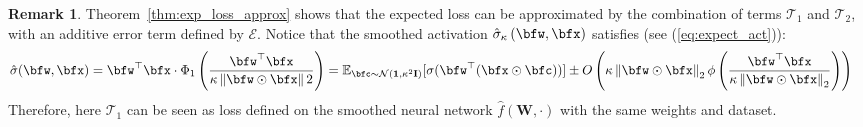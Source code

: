 \documentclass[10pt]{article} %
\theoremstyle{definition}
\newtheorem{remark}[theorem]{Remark}
\theoremstyle{plain}
\newcommand{\paren}[1]{\left(#1\right)}
\newcommand{\norm}[1]{\left\|#1\right\|}
\newcommand{\indy}[1]{\mathbb{I}\left\{#1\right\}}
\newcommand{\act}[2]{\hat{\sigma}_{\kappa}\paren{#1,#2}}
\providecommand{\E}{\mathbb{E}}
\begin{document}
\begin{remark}
Theorem~\ref{thm:exp_loss_approx} shows that the expected loss can be approximated by the combination of terms $\mathcal{T}_1$ and $\mathcal{T}_2$, with an additive error term defined by $\mathcal{E}$. 
Notice that 
the smoothed activation $\act{\bfw}{\bfx}$ satisfies (see (\ref{eq:expect_act})):
\begin{align*}
    \hat{\sigma}(\bfw, \bfx) &= \bfw^\top\bfx \cdot \Phi_1\left(\frac{\bfw^\top\bfx}{\kappa\norm{\bfw \odot \bfx}2}\right)
    = \E_{\bfc \sim \mathcal{N}(\mathbf{1}, \kappa^2\mathbf{I})}[\sigma(\bfw^\top(\bfx \odot \bfc))]
    \pm O\paren{\kappa\norm{\bfw\odot\bfx}_2\phi\paren{\frac{\bfw^\top\bfx}{\kappa\norm{\bfw\odot\bfx}_2}}}
\end{align*}
Therefore, here $\mathcal{T}_1$ can be seen as loss defined on the smoothed neural network $\hat{f}\paren{\mathbf{W},\cdot}$ with the same weights and dataset. 
\end{remark}
\end{document}
